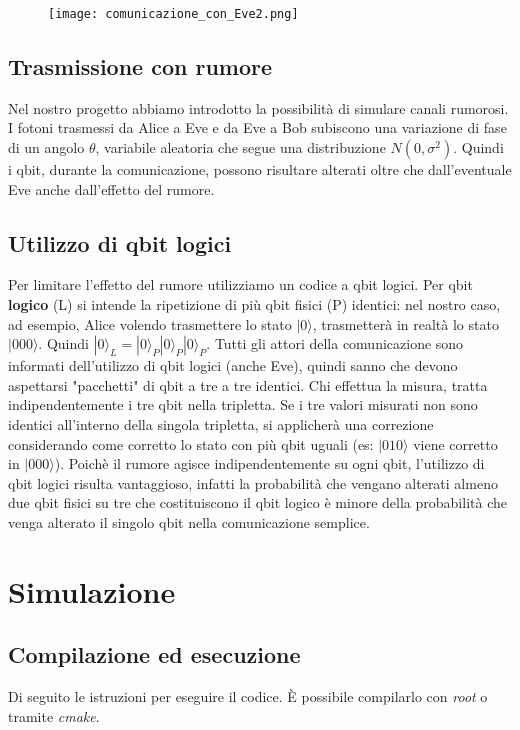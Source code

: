 \documentclass[11 pt, a4paper]{article}
\begin{document}
\begin{figure}[htbp!]
\centering
\texttt{[image: comunicazione\_con\_Eve2.png]}
\end{figure}

\subsection{Trasmissione con rumore}
Nel nostro progetto abbiamo introdotto la possibilità di simulare canali rumorosi. I fotoni trasmessi da Alice a Eve e da Eve a Bob subiscono una variazione di fase di un angolo $\theta$, variabile aleatoria che segue una distribuzione $N(0,\sigma^2)$.
Quindi i qbit, durante la comunicazione, possono risultare alterati oltre che dall'eventuale Eve anche dall'effetto del rumore.

\subsection{Utilizzo di qbit logici}
Per limitare l'effetto del rumore utilizziamo un codice a qbit logici.
Per qbit \textbf{logico} (L) si intende la ripetizione di più qbit fisici (P) identici: nel nostro caso, ad esempio, Alice volendo trasmettere lo stato $|0\rangle$, trasmetterà in realtà lo stato $|000\rangle$. Quindi $|0\rangle_L = |0\rangle_P|0\rangle_P|0\rangle_P$.
Tutti gli attori della comunicazione sono informati dell'utilizzo di qbit logici (anche Eve), quindi sanno che devono aspettarsi "pacchetti" di qbit a tre a tre identici. Chi effettua la misura, tratta indipendentemente i tre qbit nella tripletta. Se i tre valori misurati non sono identici all'interno della singola tripletta, si applicherà una correzione considerando come corretto lo stato con più qbit uguali (es: $|010\rangle$ viene corretto in $|000\rangle$).
Poichè il rumore agisce indipendentemente su ogni qbit, l'utilizzo di qbit logici risulta vantaggioso, infatti la probabilità che vengano alterati almeno due qbit fisici su tre che costituiscono il qbit logico è minore della probabilità che venga alterato il singolo qbit nella comunicazione semplice.

\section{Simulazione}
\subsection{Compilazione ed esecuzione}
Di seguito le istruzioni per eseguire il codice. È possibile compilarlo con \textit{root} o tramite \textit{cmake}.
\end{document}
